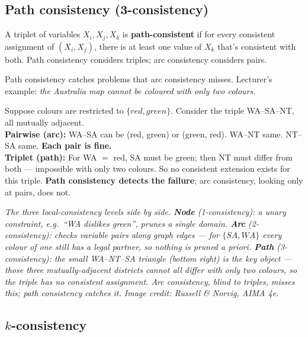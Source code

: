 \documentclass[11pt, a4paper]{article}
\begin{document}
\subsection{Path consistency (3-consistency)}

\begin{defbox}
A triplet of variables $X_i, X_j, X_k$ is \textbf{path-consistent} if for every consistent assignment of $(X_i, X_j)$, there is at least one value of $X_k$ that's consistent with both. Path consistency considers triples; arc consistency considers pairs.
\end{defbox}

Path consistency catches problems that arc consistency misses. Lecturer's example: \emph{the Australia map cannot be coloured with only two colours.}

\begin{exbox}
Suppose colours are restricted to $\{red, green\}$. Consider the triple WA--SA--NT, all mutually adjacent.\\[0.3em]
\textbf{Pairwise (arc):} WA--SA can be (red, green) or (green, red). WA--NT same. NT--SA same. \textbf{Each pair is fine.}\\[0.3em]
\textbf{Triplet (path):} For WA $=$ red, SA must be green; then NT must differ from both — impossible with only two colours. So no consistent extension exists for this triple. \textbf{Path consistency detects the failure}; arc consistency, looking only at pairs, does not.
\end{exbox}

\begin{center}

\footnotesize\textit{The three local-consistency levels side by side. \textbf{Node} (1-consistency): a unary constraint, e.g.\ ``WA dislikes green'', prunes a single domain. \textbf{Arc} (2-consistency): checks variable pairs along graph edges --- for $\{SA,WA\}$ every colour of one still has a legal partner, so nothing is pruned a priori. \textbf{Path} (3-consistency): the small WA--NT--SA triangle (bottom right) is the key object --- those three mutually-adjacent districts cannot all differ with only two colours, so the triple has no consistent assignment. Arc consistency, blind to triples, misses this; path consistency catches it. Image credit: Russell \& Norvig, AIMA 4e.}
\end{center}

\subsection{$k$-consistency}
\end{document}
